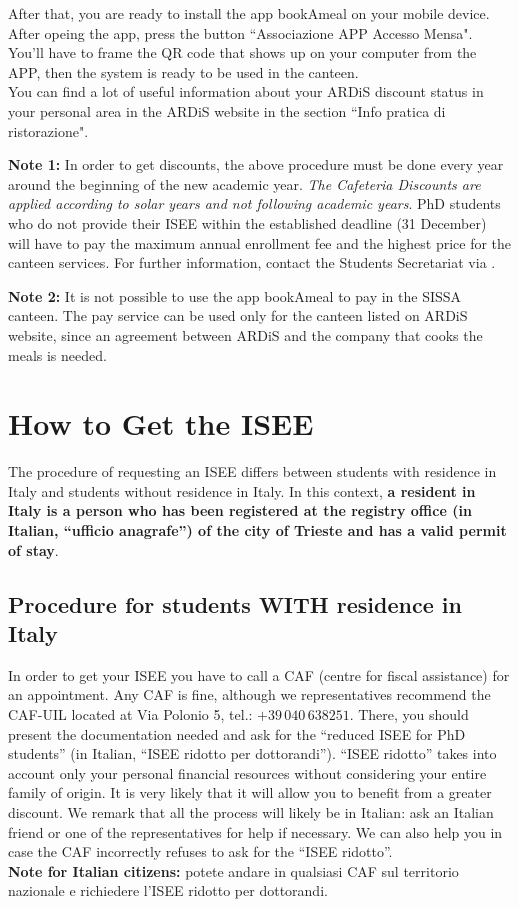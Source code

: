 \documentclass{sissavademecum}
\begin{document}
After that, you are ready to install the app bookAmeal on your mobile device. After opeing the app, press the button ``Associazione APP Accesso Mensa". You'll have to frame the QR code that shows up on your computer from the APP, then the system is ready to be used in the canteen. \\
You can find a lot of useful information about your ARDiS discount status in your personal area in the ARDiS website in the section ``Info pratica di ristorazione".  

\textbf{Note 1:} In order to get discounts, the above procedure must be done every year around the beginning of the new academic year. \emph{The Cafeteria Discounts are applied according to solar years and not following academic years}. PhD students who do not provide their ISEE within the established deadline (31 December) will have to pay the maximum annual enrollment fee and the highest price for the canteen services. For further information, contact the Students Secretariat via .

\textbf{Note 2:} It is not possible to use the app bookAmeal to pay in the SISSA canteen. The pay service can be used only for the canteen listed on ARDiS website, since an agreement between ARDiS and the company that cooks the meals is needed.


\section{How to Get the ISEE}

The procedure of requesting an ISEE differs between students with residence in Italy and students without residence in Italy. In this context, \textbf{a resident in Italy is a person who has been registered at the registry office (in Italian, ``ufficio anagrafe'') of the city of Trieste and has a valid permit of stay}.

\subsection{Procedure for students WITH residence in Italy}

In order to get your ISEE you have to call a CAF (centre for fiscal assistance) for an appointment. Any CAF is fine, although we representatives recommend the CAF-UIL located at Via Polonio 5, tel.: $+39 \, 040 \, 638251$. There, you should present the documentation needed and ask for the ``reduced ISEE for PhD students'' (in Italian, ``ISEE ridotto per dottorandi''). ``ISEE ridotto'' takes into account only your personal financial resources without considering your entire family of origin. It is very likely that it will allow you to benefit from a greater discount. We remark that all the process will likely be in Italian: ask an Italian friend or one of the representatives for help if necessary. We can also help you in case the CAF incorrectly refuses to ask for the ``ISEE ridotto''. \\
\textbf{Note for Italian citizens:} potete andare in qualsiasi CAF sul territorio nazionale e richiedere l'ISEE ridotto per dottorandi.
    
\end{document}

